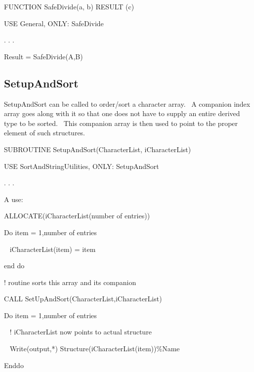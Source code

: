 FUNCTION SafeDivide(a, b) RESULT (c)

USE General, ONLY: SafeDivide

. . .

Result = SafeDivide(A,B)

\subsection{SetupAndSort}\label{setupandsort}

SetupAndSort can be called to order/sort a character array.~ A companion index array goes along with it so that one does not have to supply an entire derived type to be sorted.~ This companion array is then used to point to the proper element of such structures.

SUBROUTINE SetupAndSort(CharacterList, iCharacterList)

USE SortAndStringUtilities, ONLY: SetupAndSort

. . .

A use:

ALLOCATE(iCharacterList(number of entries))

Do item = 1,number of entries

~ iCharacterList(item) = item

end do

! routine sorts this array and its companion

CALL SetUpAndSort(CharacterList,iCharacterList)

Do item = 1,number of entries

~ ! iCharacterList now points to actual structure

~ Write(output,*) Structure(iCharacterList(item))\%Name

Enddo
